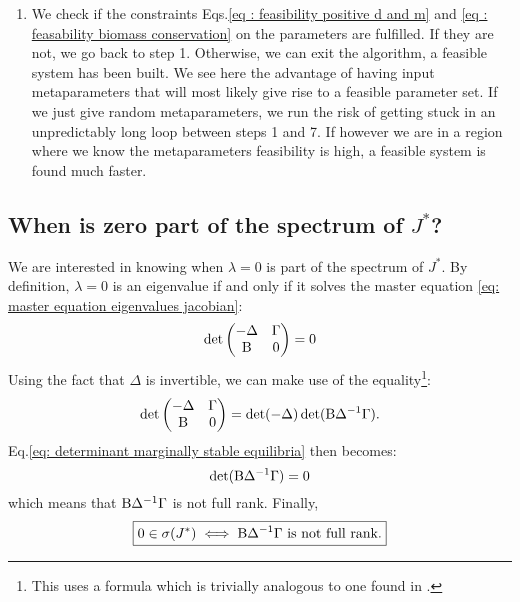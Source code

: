 \documentclass[12pt]{report}
\begin{document}
\begin{enumerate}
  \item We check if the constraints Eqs.\eqref{eq : feasibility positive d and m} and \eqref{eq : feasability biomass conservation} on the parameters are fulfilled. If they are not, we go back to step 1. Otherwise, we can exit the algorithm, a feasible system has been built. We see here the advantage of having input metaparameters that will most likely give rise to a feasible parameter set. If we just give random metaparameters, we run the risk of getting stuck in an unpredictably long loop between steps 1 and 7. If however we are in a region where we know the metaparameters feasibility is high, a feasible system is found much faster.
\end{enumerate}

\subsection{When is zero part of the spectrum of $J^*$?}\label{sec : zero part of spectrum}
We are interested in knowing when $\lambda=0$ is part of the spectrum of $J^*$. By definition, $\lambda=0$ is an eigenvalue if and only if it solves the master equation \eqref{eq: master equation eigenvalues jacobian}:
\begin{equation}
\det
\begin{pmatrix}
  -\Delta   & \Gamma \\
  \text{B} & 0
\end{pmatrix} = 0 \label{eq: determinant marginally stable equilibria}
\end{equation}
Using the fact that $\Delta$ is invertible, we can make use of the equality\footnote{This uses a formula which is trivially analogous to one found in \cite{powell_calculating_2011}.}:
\begin{equation}
\det\begin{pmatrix}
  -\Delta   & \Gamma \\
  \text{B} & 0
\end{pmatrix} = \det(-\Delta)\det(\text{B}\Delta^{-1}\Gamma).
\end{equation}
Eq.\eqref{eq: determinant marginally stable equilibria} then becomes:
\begin{equation}
\det(\text{B}\Delta^{-1}\Gamma)=0
\end{equation}
which means that $\text{B} \Delta^{-1}\Gamma$ is not full rank. Finally,
\begin{equation}
\boxed{
0 \in \sigma(J^*) \iff \text{B} \Delta^{-1}\Gamma \text{ is not full rank.}\label{eq : condition zero in spectrum of J}
}
\end{equation}
\end{document}
